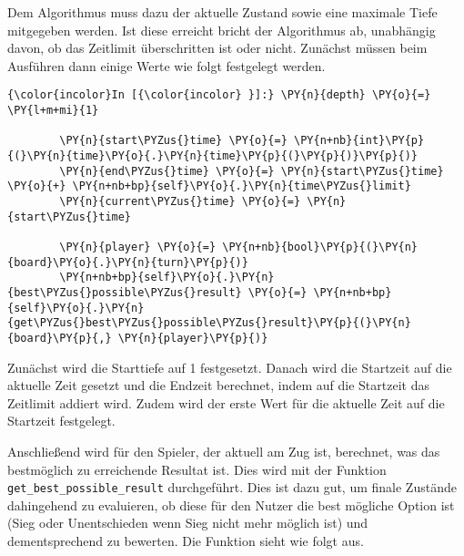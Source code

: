 Dem Algorithmus muss dazu der aktuelle Zustand sowie eine maximale Tiefe
mitgegeben werden. Ist diese erreicht bricht der Algorithmus ab,
unabhängig davon, ob das Zeitlimit überschritten ist oder nicht.
Zunächst müssen beim Ausführen dann einige Werte wie folgt festgelegt
werden.

    \begin{Verbatim}[commandchars=\\\{\}]
{\color{incolor}In [{\color{incolor} }]:} \PY{n}{depth} \PY{o}{=} \PY{l+m+mi}{1}
            
        \PY{n}{start\PYZus{}time} \PY{o}{=} \PY{n+nb}{int}\PY{p}{(}\PY{n}{time}\PY{o}{.}\PY{n}{time}\PY{p}{(}\PY{p}{)}\PY{p}{)}
        \PY{n}{end\PYZus{}time} \PY{o}{=} \PY{n}{start\PYZus{}time} \PY{o}{+} \PY{n+nb+bp}{self}\PY{o}{.}\PY{n}{time\PYZus{}limit}
        \PY{n}{current\PYZus{}time} \PY{o}{=} \PY{n}{start\PYZus{}time}
        
        \PY{n}{player} \PY{o}{=} \PY{n+nb}{bool}\PY{p}{(}\PY{n}{board}\PY{o}{.}\PY{n}{turn}\PY{p}{)}
        \PY{n+nb+bp}{self}\PY{o}{.}\PY{n}{best\PYZus{}possible\PYZus{}result} \PY{o}{=} \PY{n+nb+bp}{self}\PY{o}{.}\PY{n}{get\PYZus{}best\PYZus{}possible\PYZus{}result}\PY{p}{(}\PY{n}{board}\PY{p}{,} \PY{n}{player}\PY{p}{)}
\end{Verbatim}

    Zunächst wird die Starttiefe auf 1 festgesetzt. Danach wird die
Startzeit auf die aktuelle Zeit gesetzt und die Endzeit berechnet, indem
auf die Startzeit das Zeitlimit addiert wird. Zudem wird der erste Wert
für die aktuelle Zeit auf die Startzeit festgelegt.

Anschließend wird für den Spieler, der aktuell am Zug ist, berechnet,
was das bestmöglich zu erreichende Resultat ist. Dies wird mit der
Funktion \texttt{get\_best\_possible\_result} durchgeführt. Dies ist
dazu gut, um finale Zustände dahingehend zu evaluieren, ob diese für den
Nutzer die best mögliche Option ist (Sieg oder Unentschieden wenn Sieg
nicht mehr möglich ist) und dementsprechend zu bewerten. Die Funktion
sieht wie folgt aus.

